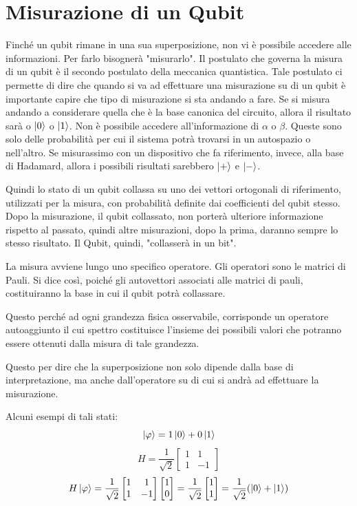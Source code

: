 \section{Misurazione di un Qubit}
Finché un qubit rimane in una sua superposizione, non vi è possibile accedere alle informazioni. Per farlo bisognerà "misurarlo". Il postulato che governa la misura di un qubit è il secondo postulato della meccanica quantistica. Tale postulato ci permette di dire che quando si va ad effettuare una misurazione su di un qubit è importante capire che tipo di misurazione si sta andando a fare. Se si misura andando a considerare quella che è la base canonica del circuito, allora il risultato sarà o \(\ket{0}\) o \(\ket{1}\). Non è possibile accedere all'informazione di \(\alpha\) o \(\beta\). Queste sono solo delle probabilità per cui il sistema potrà trovarsi in un autospazio o nell'altro. Se misurassimo con un dispositivo che fa riferimento, invece, alla base di Hadamard, allora i possibili risultati sarebbero \(\ket{+}\) e \(\ket{-}\). 

Quindi lo stato di un qubit collassa su uno dei vettori ortogonali di riferimento, utilizzati per la misura, con probabilità definite dai coefficienti del qubit stesso.
Dopo la misurazione, il qubit collassato, non porterà ulteriore informazione rispetto al passato, quindi altre misurazioni, dopo la prima, daranno sempre lo stesso risultato. Il Qubit, quindi, "collasserà in un bit".

La misura avviene lungo uno specifico operatore. Gli operatori sono le matrici di Pauli. Si dice così, poiché gli autovettori associati alle matrici di pauli, costituiranno la base in cui il qubit potrà collassare.

Questo perché ad ogni grandezza fisica osservabile, corrisponde un operatore autoaggiunto il cui spettro costituisce l'insieme dei possibili valori che potranno essere ottenuti dalla misura di tale grandezza.

Questo per dire che la superposizione non solo dipende dalla base di interpretazione, ma anche dall'operatore su di cui si andrà ad effettuare la misurazione.

Alcuni esempi di tali stati:
\[
\ket{\varphi} = 1 \ket{0} + 0 \ket{1}
\]
\[
H = \frac{1}{\sqrt{2}}
\begin{bmatrix}
1 & 1 \\
1 & -1
\end{bmatrix}
\]
\[
H \ket{\varphi} = \frac{1}{\sqrt{2}}
\begin{bmatrix}
1 & 1 \\
1 & -1    
\end{bmatrix}
\begin{bmatrix}
1 \\
0
\end{bmatrix}
= \frac{1}{\sqrt{2}}
\begin{bmatrix}
1 \\
1
\end{bmatrix}
= \frac{1}{\sqrt{2}} (\ket{0} + \ket{1})
\]


